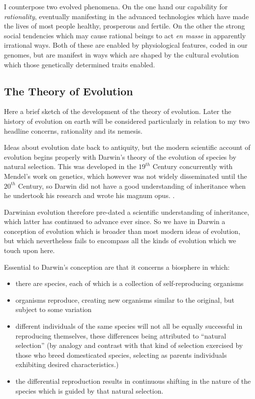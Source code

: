 \documentclass[10pt,titlepage]{article}
\begin{document}
I counterpose two evolved phenomena.
On the one hand our capability for \emph{rationality}, eventually manifesting in the advanced technologies which have made the lives of most people healthy, prosperous and fertile.
On the other the strong social tendencies which may cause rational beings to act \emph{en masse} in apparently irrational ways.
Both of these are enabled by physiological features, coded in our genomes, but are manifest in ways which are shaped by the cultural evolution which those genetically determined traits enabled.


\subsection{The Theory of Evolution}

Here a brief sketch of the development of the theory of evolution.
Later the history of evolution on earth will be considered particularly in relation to my two headline concerns, rationality and its nemesis.

Ideas about evolution date back to antiquity, but the modern scientific account of evolution begins properly with Darwin's theory of the evolution of species by natural selection.
This was developed in the $19^{th}$ Century concurrently with Mendel's work on genetics, which however was not widely disseminated until the $20^{th}$ Century, so Darwin did not have a good understanding of inheritance when he undertook his research and wrote his magnum opus. \cite{darwin-oos}.

Darwinian evolution therefore pre-dated a scientific understanding of inheritance, which latter has continued to advance ever since.
So we have in Darwin a conception of evolution which is broader than most modern ideas of evolution, but which nevertheless fails to encompass all the kinds of evolution which we touch upon here.

Essential to Darwin's conception are that it concerns a biosphere in which:
\begin{itemize}
  \item there are species, each of which is a collection of self-reproducing organisms
  \item organisms reproduce, creating new organisms similar to the original, but subject to some variation
  \item different individuals of the same species will not all be equally successful in reproducing themselves, these differences being attributed to ``natural selection'' (by analogy and contrast with that kind of selection exercised by those who breed domesticated species, selecting as parents individuals exhibiting desired characteristics.)
  \item the differential reproduction results in continuous shifting in the nature of the species which is guided by that natural selection.
\end{itemize}
\end{document}
